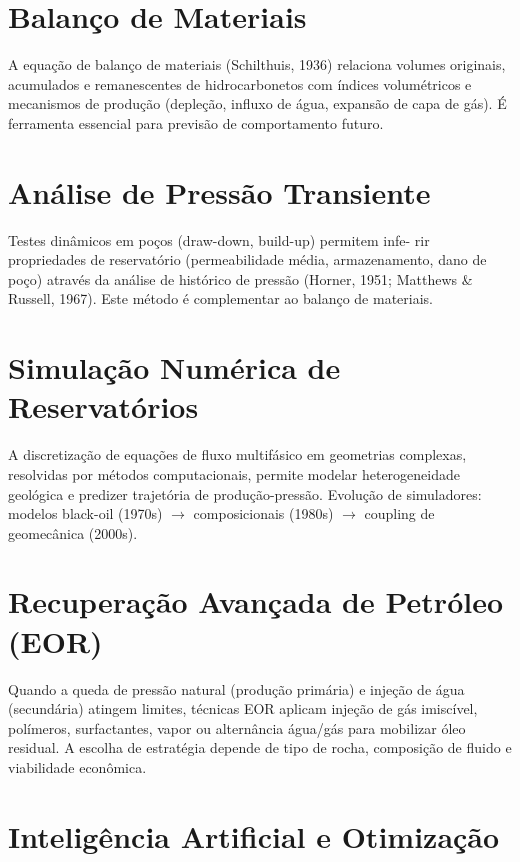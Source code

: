 \documentclass[12pt,a4paper,oneside,brazilian,sumario=tradicional]{abntex2}
\begin{document}
\section{Balanço de Materiais}

A equação de balanço de materiais (Schilthuis, 1936) relaciona volumes originais, acumulados e remanescentes de hidrocarbonetos com índices volumétricos e mecanismos de produção (depleção, influxo de água, expansão de capa de gás). É ferramenta essencial para previsão de comportamento futuro.

\section{Análise de Pressão Transiente}

Testes dinâmicos em poços (draw-down, build-up) permitem infe- rir propriedades de reservatório (permeabilidade média, armazenamento, dano de poço) através da análise de histórico de pressão (Horner, 1951; Matthews \& Russell, 1967). Este método é complementar ao balanço de materiais.

\section{Simulação Numérica de Reservatórios}

A discretização de equações de fluxo multifásico em geometrias complexas, resolvidas por métodos computacionais, permite modelar heterogeneidade geológica e predizer trajetória de produção-pressão. Evolução de simuladores: modelos black-oil (1970s) $\rightarrow$ composicionais (1980s) $\rightarrow$ coupling de geomecânica (2000s).

\section{Recuperação Avançada de Petróleo (EOR)}

Quando a queda de pressão natural (produção primária) e injeção de água (secundária) atingem limites, técnicas EOR aplicam injeção de gás imiscível, polímeros, surfactantes, vapor ou alternância água/gás para mobilizar óleo residual. A escolha de estratégia depende de tipo de rocha, composição de fluido e viabilidade econômica.

\section{Inteligência Artificial e Otimização}
\end{document}
